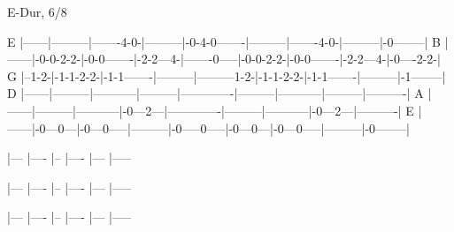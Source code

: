 E-Dur, 6/8

E |------|---------|-------4-0-|---------|-0-4-0-------|---------|-------4-0-|---------|-0--------|
B |------|-0-0-2-2-|-0-0-------|-2-2---4-|-------0-----|-0-0-2-2-|-0-0-------|-2-2---4-|-0----2-2-|
G |--1-2-|-1-1-2-2-|-1-1-------|---------|---------1-2-|-1-1-2-2-|-1-1-------|---------|-1--------|
D |------|---------|-----------|---------|-------------|---------|-----------|---------|----------|
A |------|---------|-----------|-0---2---|-------------|---------|-----------|-0---2---|----------|
E |------|-0---0---|-0---0-----|---------|-0-----0-----|-0---0---|-0---0-----|---------|-0--------|


|---
|----
|--
|----
|---
|-----


|---
|----
|--
|----
|---
|-----


|---
|----
|--
|----
|---
|-----
